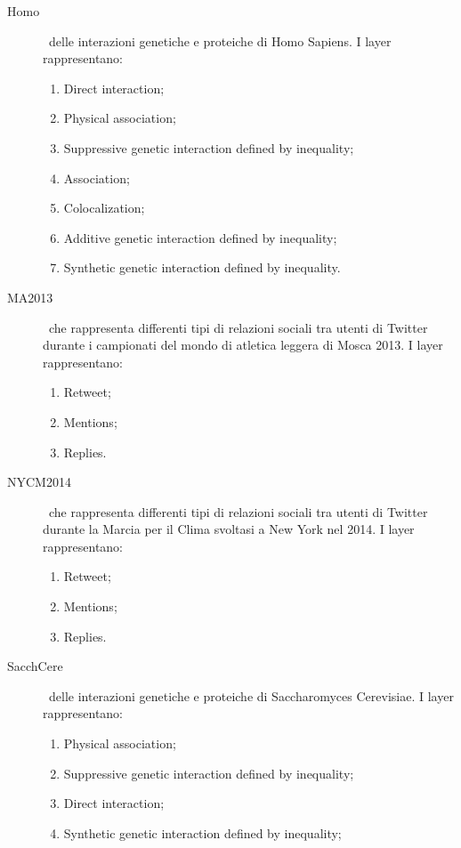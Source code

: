 \begin{description}
    \item[Homo] \mulx\ delle interazioni genetiche e proteiche di 
    Homo Sapiens. I layer rappresentano:
    \begin{enumerate}
        \item Direct interaction;
        \item Physical association;
        \item Suppressive genetic interaction defined by inequality;
        \item Association;
        \item Colocalization;
        \item Additive genetic interaction defined by inequality;
        \item Synthetic genetic interaction defined by inequality.
    \end{enumerate} 
    \item[MA2013] \mulx\ che rappresenta differenti tipi di relazioni sociali 
        tra utenti di Twitter durante i campionati del mondo di atletica leggera 
        di Mosca 2013.
        I layer rappresentano:
        \begin{enumerate}
            \item Retweet;
            \item Mentions;
            \item Replies.
        \end{enumerate}
    \item[NYCM2014] \mulx\ che rappresenta differenti tipi di relazioni sociali 
        tra utenti di Twitter durante la Marcia per il Clima svoltasi a New York nel 2014.
        I layer rappresentano:
        \begin{enumerate}
            \item Retweet;
            \item Mentions;
            \item Replies.
        \end{enumerate}
    \item[SacchCere] \mulx\ delle interazioni genetiche e proteiche di 
        Saccharomyces Cerevisiae. I layer rappresentano:
        \begin{enumerate}
            \item Physical association;
            \item Suppressive genetic interaction defined by inequality;
            \item Direct interaction;
            \item Synthetic genetic interaction defined by inequality;

\end{enumerate}
\end{description}
